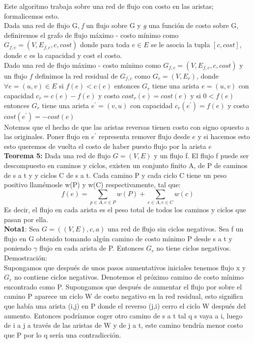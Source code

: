 \documentclass[sn-mathphys,Numbered]{sn-jnl}%
\theoremstyle{thmstyleone}%
\theoremstyle{thmstyletwo}%
\theoremstyle{thmstylethree}%
\begin{document}
Este algoritmo trabaja sobre una red de flujo con costo en las aristas; formalicemos esto.\\
Dada una red de flujo G, \textit{f} un flujo sobre G y \textit{g} una función de costo sobre G, definiremos el grafo de flujo máximo - costo mínimo como $G_{f,c} = (V,E_{f,c},c,cost)$ donde para toda $e \in E$ se le asocia la tupla $[c,cost]$, donde c es la capacidad y cost el costo.\\
Dado una red de flujo máximo - costo mínimo como $G_{f,c} = (V,E_{f,c},c,cost)$ y un flujo $f$ definimos la red residual de $G_{f,c}$ como $G_r = (V,E_r)$, donde $\forall e = (u,v) \in E$  si $f(e) < c(e)$ entonces $G_r$ tiene una arista $e = (u,v)$ con capacidad $c_r = c(e) - f(e)$ y costo $cost_r(e) = cost(e)$ y si $0 < f(e)$ entonces $G_r$ tiene una arista $e^{'} = (v,u)$ con capacidad $c_r(e^{'}) = f(e)$ y costo $cost(e^{'}) = -cost(e)$\\
Notemos que el hecho de que las aristas reversas tienen costo con signo opuesto a las originales. Poner flujo en $e^'$ representa remover flujo desde $e$ y si hacemos esto esto queremos de vuelta el costo de haber puesto flujo por la arista $e$\\

\textbf{Teorema 5:} Dada una red de flujo $G = (V,E)$ y un flujo f. El flujo f puede ser descompuesto en caminos y ciclos, existen un conjunto finito A, de P de caminos de s a t y y ciclos C de s a t. Cada camino P y cada ciclo C tiene un peso positivo llamémosle w(P) y w(C) respectivamente, tal que:
$$f(e) = \sum_{p\in A,e\in P}w(P) + \sum_{c\in A,e\in C} w(c)$$
Es decir, el flujo en cada arista es el peso total de todos los caminos y ciclos que pasan por ella.\\

\textbf{Nota1}: Sea $G=((V,E),c,a)$ una red de flujo sin ciclos negativos. Sea f un flujo en G obtenido tomando algún camino de costo mínimo P desde s a t y poniendo $\gamma$ flujo en cada arista de P. Entonces $G_r$ no tiene ciclos negativos.\\
Demostración:\\
Supongamos que después de unos pasos aumentativos iniciales tenemos flujo x y $G_r$ no contiene ciclos negativos. Denotemos el próximo camino de costo mínimo encontrado como P. Supongamos que después de aumentar el flujo por sobre el camino P aparece un ciclo W de costo negativo en la red residual, 
esto significa que había una arista (i,j) en P donde el reverso (j,i) cerro el ciclo W después del aumento. Entonces podríamos coger otro camino de s a t tal q s vaya a i, luego de i a j a través de las aristas de W y de j a t, este camino tendría menor costo que P por lo q ser\'ia una contradicción.\\
\end{document}
